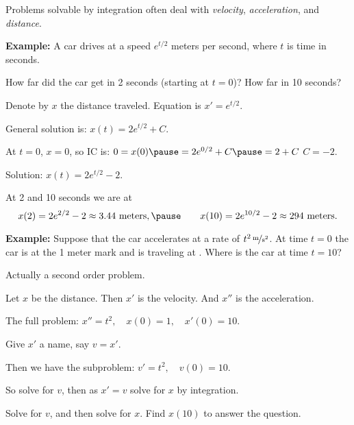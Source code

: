 \documentclass[10pt,aspectratio=169]{beamer}
\begin{document}
\begin{frame}
Problems solvable by integration often deal
with \emph{velocity}, \emph{acceleration}, and \emph{distance}.

\medskip
\pause

\textbf{Example:}
A car drives at a speed $e^{t/2}$ meters per second, where $t$ is time in seconds.

How far did the car get in 2 seconds (starting at $t=0$)?  How far in 10 seconds?

\medskip
\pause

Denote by $x$ the distance traveled.
\pause
Equation is \quad $x' = e^{t/2}$.

\medskip
\pause

General solution is: \quad
$x(t) = 2 e^{t/2} + C$.

\medskip
\pause

At $t=0$, $x=0$, so IC is:
\quad
$0 = x(0) \pause = 2e^{0/2} + C \pause = 2 + C$
\pause
\wthus
$C=-2$.

\medskip
\pause

Solution: 
\quad
$x(t) = 2 e^{t/2} - 2$.

\medskip
\pause

At 2 and 10 seconds we are at
\begin{equation*}
x(2) = 2e^{2/2} - 2 \approx 3.44 \text{ meters} ,
\pause
\qquad
x(10) = 2e^{10/2} - 2 \approx 294 \text{ meters} .
\end{equation*}
\end{frame}

\begin{frame}
\textbf{Example:}
Suppose that the car accelerates at a rate of $\unitfrac[t^2]{m}{s^2}$.
\pause
At time $t=0$ the car is at the 1 meter mark and is traveling at
.
\pause
Where is the car at time $t=10$?

\medskip
\pause

Actually a second order problem.

\medskip
\pause

Let $x$ be the distance.
\quad
Then $x'$ is the velocity.
\quad
And $x''$ is the acceleration.

\medskip
\pause

The full problem: \quad $x'' = t^2 , \quad x(0) = 1 , \quad x'(0) = 10$.

\medskip
\pause

Give $x'$ a name, say $v=x'$.

\medskip
\pause

Then we have the subproblem: \quad 
$v' = t^2, \quad v(0) = 10$.

\medskip
\pause

So solve for $v$, then as $x'=v$ solve for $x$ by integration.

\pause

\begin{exercise}
Solve for $v$, and then solve for $x$.  Find $x(10)$ to answer the
question.
\end{exercise}

\end{frame}
\end{document}
